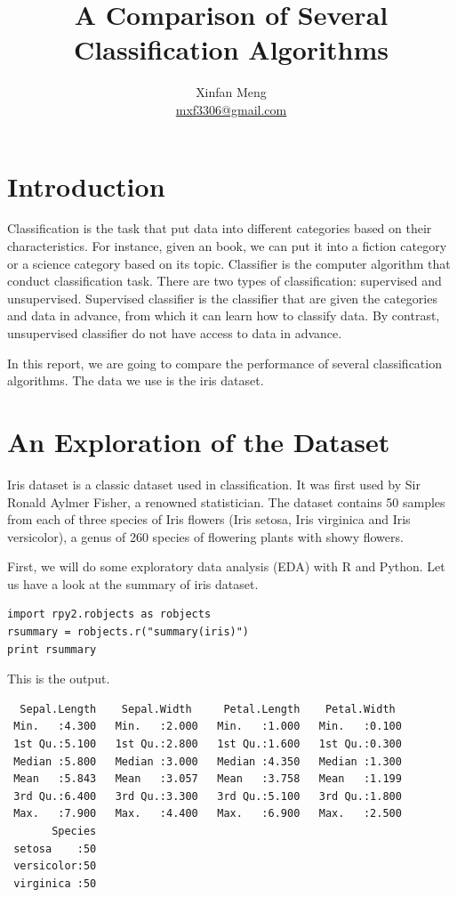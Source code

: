 \documentclass[a4paper, 11pt]{article}
\begin{document}
\title{A Comparison of Several Classification Algorithms}
\author{Xinfan Meng \\ \href{mailto:mxf3306@gmail.com}{mxf3306@gmail.com}}
\maketitle

\section{Introduction}

Classification is the task that put data into different categories
based on their characteristics.
For instance, given an book, we can put it into a fiction category
or a science category based on its topic.
Classifier is the computer algorithm that conduct classification task.
There are two types of classification: supervised and unsupervised.
Supervised classifier is the classifier that are given the categories and data in advance, 
from which it can learn how to classify data.
By contrast, unsupervised classifier do not have access to data in advance.


In this report, we are
going to compare the performance of several classification algorithms.
The data we use is the iris dataset.

\section{An Exploration of the Dataset}

Iris dataset is a classic dataset used in classification.
It was first used by Sir Ronald Aylmer Fisher, a renowned statistician.
The dataset contains 50 samples from each of three species of Iris flowers (Iris setosa, Iris virginica and Iris versicolor), 
a genus of 260 species of flowering plants with showy flowers.

First, we will do some exploratory data analysis (EDA) with R and Python.
Let us have a look at the summary of iris dataset.

\begin{verbatim}
import rpy2.robjects as robjects
rsummary = robjects.r("summary(iris)")
print rsummary
\end{verbatim}

This is the output.

\begin{verbatim}
  Sepal.Length    Sepal.Width     Petal.Length    Petal.Width   
 Min.   :4.300   Min.   :2.000   Min.   :1.000   Min.   :0.100  
 1st Qu.:5.100   1st Qu.:2.800   1st Qu.:1.600   1st Qu.:0.300  
 Median :5.800   Median :3.000   Median :4.350   Median :1.300  
 Mean   :5.843   Mean   :3.057   Mean   :3.758   Mean   :1.199  
 3rd Qu.:6.400   3rd Qu.:3.300   3rd Qu.:5.100   3rd Qu.:1.800  
 Max.   :7.900   Max.   :4.400   Max.   :6.900   Max.   :2.500  
       Species  
 setosa    :50  
 versicolor:50  
 virginica :50  
\end{verbatim}
\end{document}
